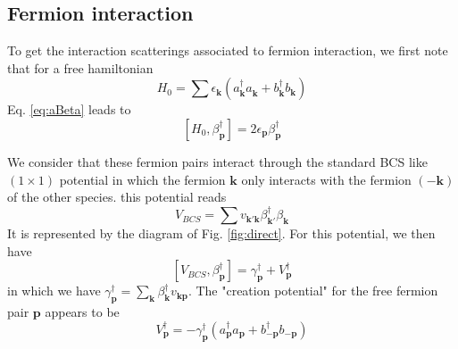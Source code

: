\documentclass[aps,prb,amsmath,amssymb,superscriptaddress,twocolumn]{revtex4-1}
\newcommand{\vk}{\ensuremath{\mathbf{k}}}
\newcommand{\vp}{\ensuremath{\mathbf{p}}}
\newcommand{\br}[1]{\ensuremath{\left(#1\right)}}
\newcommand{\mbr}[1]{\ensuremath{\left[#1\right]}}
\newcommand{\com}[2]{\ensuremath{\mbr{#1,#2}}}
\begin{document}
\subsection{Fermion interaction}
To get the interaction scatterings associated to fermion interaction, we first note that for a free hamiltonian
\begin{equation}\label{eq:h0}
H_0=\sum{\epsilon_\vk\br{a^{\dagger}_{\vk} a^{}_{\vk}+b^{\dagger}_{\vk} b^{}_{\vk}}}
\end{equation}
Eq. \eqref{eq:aBeta} leads to 
\begin{equation}\label{eq:betaH}
\com{H_0}{\beta^{\dagger}_\vp}=2\epsilon_\vp\beta^{\dagger}_\vp
\end{equation}

We  consider that these fermion pairs interact through the standard BCS like $(1\times1)$ potential in which the fermion $\vk$ only interacts with the fermion $\br{-\vk}$ of the other species. this potential reads
\begin{equation}\label{eq:vbcs}
V_{BCS}=\sum{v_{\vk'\vk}\beta^{\dagger}_{\vk'}\beta^{}_{\vk}}
\end{equation}
It is represented by  the diagram of Fig. \ref{fig:direct}. For this potential, we then have 
\begin{equation}\label{eq:vbeta}
\com{V_{BCS}}{\beta^{\dagger}_\vp}=\gamma^{\dagger}_\vp+V^{\dagger}_\vp
\end{equation}
in which we have $\gamma^{\dagger}_\vp=\sum_\vk\beta^{\dagger}_\vk{}v_{\vk\vp}$. The "creation potential" for the free fermion pair $\vp$ appears to be 
\begin{equation}\label{eq:betaV}
V^{\dagger}_\vp=-{\gamma^{\dagger}_\vp}\br{a^{\dagger}_{\vp}a^{}_{\vp}+b^{\dagger}_{-\vp}b^{}_{-\vp}}
\end{equation}
\end{document}
